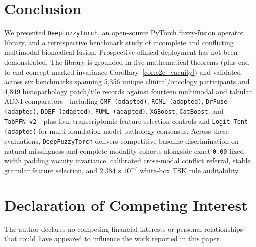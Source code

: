 \documentclass[10pt,twocolumn]{article}
\begin{document}
\section{Conclusion}
\label{sec:conclusion}
We presented \texttt{DeepFuzzyTorch}, an open-source PyTorch fuzzy-fusion operator library,
and a retrospective benchmark study of incomplete and conflicting multimodal biomedical
fusion. Prospective clinical deployment has not been demonstrated. The library is grounded
in five mathematical theorems
(plus end-to-end concept-masked invariance Corollary~\ref{cor:e2e_vacuity}) and validated
across six benchmarks spanning 5,356 unique clinical/oncology participants and 4,849
histopathology patch/tile records against fourteen multimodal and tabular ADNI
comparators---including \texttt{QMF (adapted)}, \texttt{RCML (adapted)},
\texttt{DrFuse (adapted)}, \texttt{DDEF (adapted)}, \texttt{FUML (adapted)},
\texttt{XGBoost}, \texttt{CatBoost}, and \texttt{TabPFN~v2}---plus four transcriptomic
feature-selection controls and \texttt{Logit-Tent (adapted)} for multi-foundation-model
pathology consensus. Across these evaluations,
\texttt{DeepFuzzyTorch} delivers competitive baseline discrimination on natural-missingness
and complete-modality cohorts alongside exact \texttt{0.00} fixed-width padding vacuity
invariance, calibrated cross-modal conflict referral, stable granular feature selection, and
$2.384 \times 10^{-7}$ white-box TSK rule auditability.

\section*{Declaration of Competing Interest}
The author declares no competing financial interests or personal relationships that could have
appeared to influence the work reported in this paper.
\end{document}
